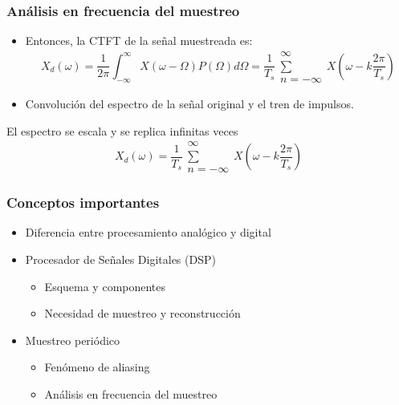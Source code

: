 \begin{frame}\frametitle{Análisis en frecuencia del muestreo}
  \begin{itemize}
    \item Entonces, la CTFT de la señal muestreada es: \[X_d(\omega)=\frac{1}{2\pi}\int_{-\infty}^{\infty}X(\omega - \Omega)P(\Omega)d\Omega=\frac{1}{T_s}\substack{\infty\\\sum\\n=-\infty}X(\omega- k \frac{2\pi}{T_s})\]
    \item Convolución del espectro de la señal original y el tren de impulsos.
  \end{itemize}
  \begin{alertblock}{El espectro se escala y se replica infinitas veces}
    \vspace{0.2cm}
    \[X_d(\omega)=\frac{1}{T_s}\substack{\infty\\\sum\\n=-\infty}X(\omega- k \frac{2\pi}{T_s})\]
    \vspace{0.1cm}
  \end{alertblock}
\end{frame}

\begin{frame}\frametitle{Conceptos importantes}
  \begin{itemize}
    \item \alert{Diferencia entre procesamiento analógico y digital}
    \item \alert{Procesador de Señales Digitales (DSP)}
    \begin{itemize}
      \item Esquema y componentes
      \item Necesidad de muestreo y reconstrucción
    \end{itemize}
    \item \alert{Muestreo periódico}
    \begin{itemize}
      \item Fenómeno de aliasing
      \item Análisis en frecuencia del muestreo
    \end{itemize}
  \end{itemize}
\end{frame}


